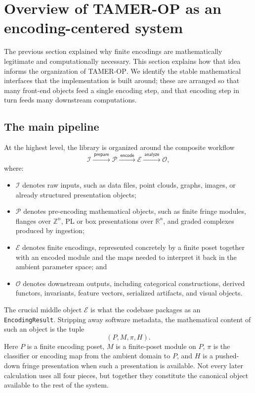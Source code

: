 \documentclass[11pt]{article}
\newcommand{\TAMER}{\textsc{TAMER-OP}}
\theoremstyle{definition}
\theoremstyle{remark}
\begin{document}
\section{Overview of \TAMER{} as an encoding-centered system}\label{sec:system-overview}

The previous section explained why finite encodings are mathematically legitimate and computationally necessary.  This section explains how that idea informs the organization of \TAMER{}.  We identify the stable mathematical interfaces that the implementation is built around; these are arranged so that many front-end objects feed a single encoding step, and that encoding step in turn feeds many downstream computations.

\subsection{The main pipeline}

At the highest level, the library is organized around the composite workflow
\[
\mathcal{I}
\xrightarrow{\ \mathsf{prepare}\ }
\mathcal{P}
\xrightarrow{\ \mathsf{encode}\ }
\mathcal{E}
\xrightarrow{\ \mathsf{analyze}\ }
\mathcal{O},
\]
where:
\begin{itemize}[leftmargin=1.5em]
    \item $\mathcal{I}$ denotes raw inputs, such as data files, point clouds, graphs, images, or already structured presentation objects;
    \item $\mathcal{P}$ denotes pre-encoding mathematical objects, such as finite fringe modules, flanges over $\mathbb{Z}^n$, PL or box presentations over $\mathbb{R}^n$, and graded complexes produced by ingestion;
    \item $\mathcal{E}$ denotes finite encodings, represented concretely by a finite poset together with an encoded module and the maps needed to interpret it back in the ambient parameter space; and
    \item $\mathcal{O}$ denotes downstream outputs, including categorical constructions, derived functors, invariants, feature vectors, serialized artifacts, and visual objects.
\end{itemize}

The crucial middle object $\mathcal{E}$ is what the codebase packages as an \texttt{EncodingResult}.  Stripping away software metadata, the mathematical content of such an object is the tuple
\[
(P,M,\pi,H).
\]
Here $P$ is a finite encoding poset, $M$ is a finite-poset module on $P$, $\pi$ is the classifier or encoding map from the ambient domain to $P$, and $H$ is a pushed-down fringe presentation when such a presentation is available.  Not every later calculation uses all four pieces, but together they constitute the canonical object available to the rest of the system.
\end{document}
